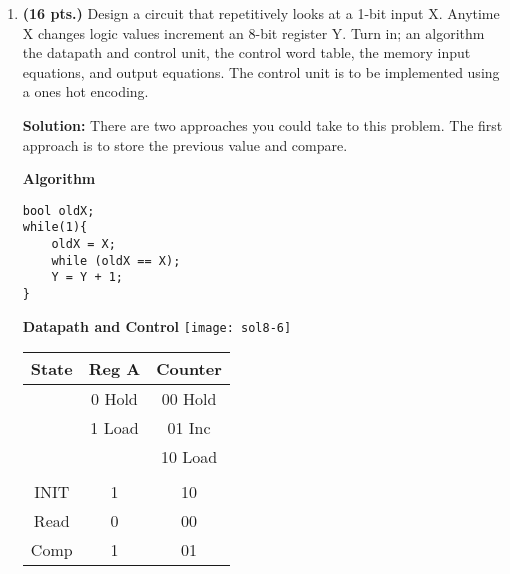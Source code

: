 \begin{enumerate}
    \item  \textbf{ (16 pts.)}
        Design a circuit that repetitively looks at a 1-bit input X.
        Anytime X changes logic values increment an 8-bit
        register Y.
        Turn in; an algorithm the datapath and control unit, the control word
        table, the memory input equations, and output equations.
        The control unit is to be implemented using a ones hot encoding.
        \begin{onlysolution}[fragile]\par\textbf{Solution:} There are two approaches you
            could take to this problem. The first approach is to store the previous value
            and compare.\par
            \textbf{Algorithm}
              \begin{verbatim}
bool oldX;
while(1){
    oldX = X;
    while (oldX == X);
    Y = Y + 1;
}
\end{verbatim}
            \filbreak
            \textbf{Datapath and Control}
            \texttt{[image: sol8-6]} \par
            \begin{tabular}{c|c|c}
                State & Reg A  & Counter \\ \hline
                & 0 Hold & 00 Hold \\ \hline
                & 1 Load & 01 Inc  \\ \hline
                &        & 10 Load \\ \hline
                &        &         \\ \hline
                INIT  & 1      & 10      \\ \hline
                Read  & 0      & 00      \\ \hline
                Comp  & 1      & 01      \\ \hline
            \end{tabular}
\end{onlysolution}
\end{enumerate}

